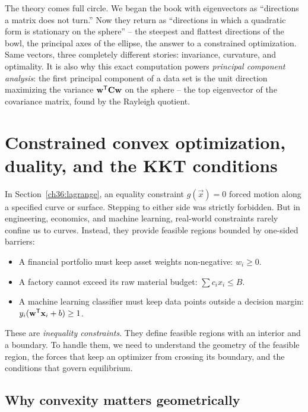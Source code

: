 \begin{aestheticbox}
The theory comes full circle. We began the book with eigenvectors as
``directions a matrix does not turn.'' Now they return as ``directions in which a
quadratic form is stationary on the sphere'' -- the steepest and flattest directions
of the bowl, the principal axes of the ellipse, the answer to a constrained
optimization. Same vectors, three completely different stories: invariance,
curvature, and optimality. It
is also why this exact computation powers \emph{principal component analysis}: the
first principal component of a data set is the unit direction maximizing the variance
$\mathbf{w}^{\mathsf{T}}\mathbf{C}\mathbf{w}$ on the sphere -- the top eigenvector of the covariance
matrix, found by the Rayleigh quotient.
\end{aestheticbox}

\section{Constrained convex optimization, duality, and the KKT conditions}
\label{ch36:kkt}

In Section~\ref{ch36:lagrange}, an equality constraint $g(\vec{x}) = 0$ forced motion
along a specified curve or surface. Stepping to either side was strictly forbidden. But in
engineering, economics, and machine learning, real-world constraints rarely confine us to
curves. Instead, they provide feasible regions bounded by one-sided barriers:
\begin{itemize}
  \item A financial portfolio must keep asset weights non-negative: $w_i \ge 0$.
  \item A factory cannot exceed its raw material budget: $\sum c_i x_i \le B$.
  \item A machine learning classifier must keep data points outside a decision margin: $y_i(\mathbf{w}^{\mathsf{T}}\mathbf{x}_i + b) \ge 1$.
\end{itemize}
These are \emph{inequality constraints}. They define feasible regions with an interior and
a boundary. To handle them, we need to understand the geometry of the feasible region, the
forces that keep an optimizer from crossing its boundary, and the conditions that govern equilibrium.

\subsection{Why convexity matters geometrically}
\label{ch36:convex-geometry}

